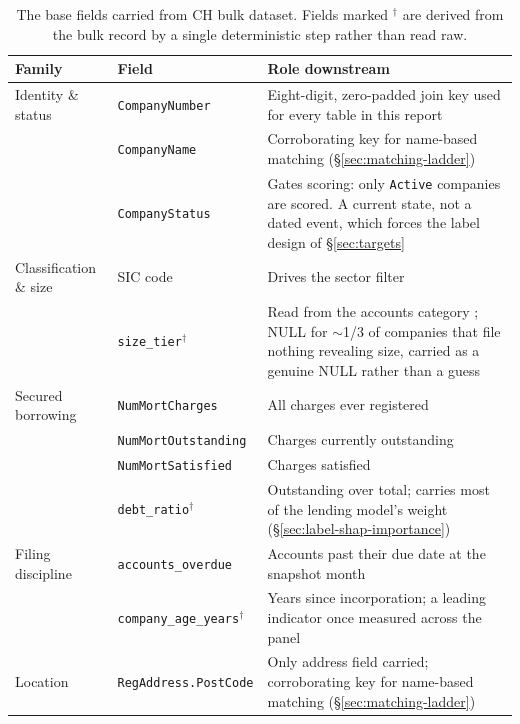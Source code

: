 \documentclass[    author={Samuel Menon Demelo; Sneha Saphala Ram Prasad; 
Viktor Ander Lindholm; Vishal Khatri},
               supervisor={Prof. Fernando Moreno-Pino},
                   degree={MSc},
                    title={Lloyds Commercial Banking Intelligence},
                 subtitle={Ranking SME Lending, Risk and Growth Prospects for Lloyds Banking Group},
                     type={},
                     year={2026}]{dissertation}
\begin{document}
\begin{collapsable}
\begin{table}[htbp]
\centering
\small
\caption[Base fields from CH bulk dataset.]{The base fields carried from CH bulk dataset. Fields marked $^{\dagger}$ are derived
from the bulk record by a single deterministic step rather than read raw.}
\label{tab:base-fields}
\begin{tabular}{@{}llp{7.2cm}@{}}
\toprule
\textbf{Family} & \textbf{Field} & \textbf{Role downstream} \\
\midrule
Identity \& status
    & \texttt{CompanyNumber}
    & Eight-digit, zero-padded join key used for every table in this report \\
    & \texttt{CompanyName}
    & Corroborating key for name-based matching (\S\ref{sec:matching-ladder}) \\
    & \texttt{CompanyStatus}
    & Gates scoring: only \texttt{Active} companies are scored. A current state, not a dated event, which forces the label design of \S\ref{sec:targets} \\
\midrule
Classification \& size
    & SIC code
    & Drives the sector filter \cite{companieshouse_sic} \\
    & \texttt{size\_tier}$^{\dagger}$
    & Read from the accounts category \cite{companieshouse_accounts_2026}; NULL for $\sim$1/3 of companies that file nothing revealing size, carried as a genuine NULL rather than a guess \\
\midrule
Secured borrowing
    & \texttt{NumMortCharges}
    & All charges ever registered \\
    & \texttt{NumMortOutstanding}
    & Charges currently outstanding \\
    & \texttt{NumMortSatisfied}
    & Charges satisfied \\
    & \texttt{debt\_ratio}$^{\dagger}$
    & Outstanding over total; carries most of the lending model's weight (\S\ref{sec:label-shap-importance}) \\
\midrule
Filing discipline
    & \texttt{accounts\_overdue}
    & Accounts past their due date at the snapshot month \\
    & \texttt{company\_age\_years}$^{\dagger}$
    & Years since incorporation; a leading indicator once measured across the panel \\
\midrule
Location
    & \texttt{RegAddress.PostCode}
    & Only address field carried; corroborating key for name-based matching (\S\ref{sec:matching-ladder}) \\
\bottomrule
\end{tabular}
\end{table}
\end{collapsable}
\end{document}
